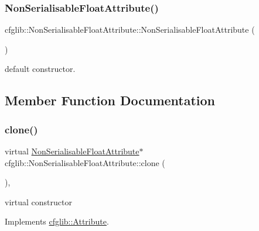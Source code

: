 \subsubsection{\texorpdfstring{Non\+Serialisable\+Float\+Attribute()}{NonSerialisableFloatAttribute()}\hspace{0.1cm}{\footnotesize\ttfamily [2/2]}}
{\footnotesize\ttfamily cfglib\+::\+Non\+Serialisable\+Float\+Attribute\+::\+Non\+Serialisable\+Float\+Attribute (\begin{DoxyParamCaption}{ }\end{DoxyParamCaption})\hspace{0.3cm}{\ttfamily [inline]}}

default constructor. 

\subsection{Member Function Documentation}
\mbox{\label{classcfglib_1_1NonSerialisableFloatAttribute_a8cf8fa70d97d003cf48c64c59609eeaf}} 
\subsubsection{\texorpdfstring{clone()}{clone()}}
{\footnotesize\ttfamily virtual \hyperlink{classcfglib_1_1NonSerialisableFloatAttribute}{Non\+Serialisable\+Float\+Attribute}$\ast$ cfglib\+::\+Non\+Serialisable\+Float\+Attribute\+::clone (\begin{DoxyParamCaption}{ }\end{DoxyParamCaption})\hspace{0.3cm}{\ttfamily [inline]}, {\ttfamily [virtual]}}

virtual constructor 

Implements \hyperlink{classcfglib_1_1Attribute_a107366042fdafe881215426059fec3f8}{cfglib\+::\+Attribute}.

\mbox{\label{classcfglib_1_1NonSerialisableFloatAttribute_a4d2bc3d3ab44c4f8e05c6c0c6f3dfc4a}} 
